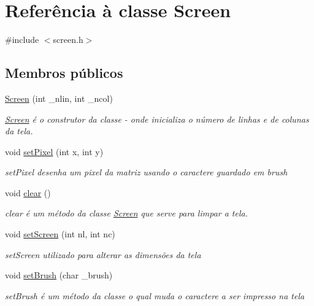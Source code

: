 \hypertarget{class_screen}{}\section{Referência à classe Screen}
\label{class_screen}


{\ttfamily \#include $<$screen.\+h$>$}

\subsection*{Membros públicos}
\begin{DoxyCompactItemize}
\item 
\hyperlink{class_screen_a6c21beca43d25854d8674445127ef2eb}{Screen} (int \+\_\+nlin, int \+\_\+ncol)
\begin{DoxyCompactList}\small\item\em \hyperlink{class_screen}{Screen} é o construtor da classe -\/ onde inicializa o número de linhas e de colunas da tela. \end{DoxyCompactList}\item 
void \hyperlink{class_screen_ae6bea81c57a22d226507c3c26fa95ee0}{set\+Pixel} (int x, int y)
\begin{DoxyCompactList}\small\item\em set\+Pixel desenha um pixel da matriz usando o caractere guardado em brush \end{DoxyCompactList}\item 
void \hyperlink{class_screen_a35e74266b2a04e37b354ceff7a5f1031}{clear} ()
\begin{DoxyCompactList}\small\item\em clear é um método da classe \hyperlink{class_screen}{Screen} que serve para limpar a tela. \end{DoxyCompactList}\item 
void \hyperlink{class_screen_a59f2c3f9e889b425940749e8f646db72}{set\+Screen} (int nl, int nc)
\begin{DoxyCompactList}\small\item\em set\+Screen utilizado para alterar as dimensões da tela \end{DoxyCompactList}\item 
void \hyperlink{class_screen_aebc4eb6cb5acf15a0f04c1494622ab23}{set\+Brush} (char \+\_\+brush)
\begin{DoxyCompactList}\small\item\em set\+Brush é um método da classe o qual muda o caractere a ser impresso na tela \end{DoxyCompactList}\end{DoxyCompactItemize}
